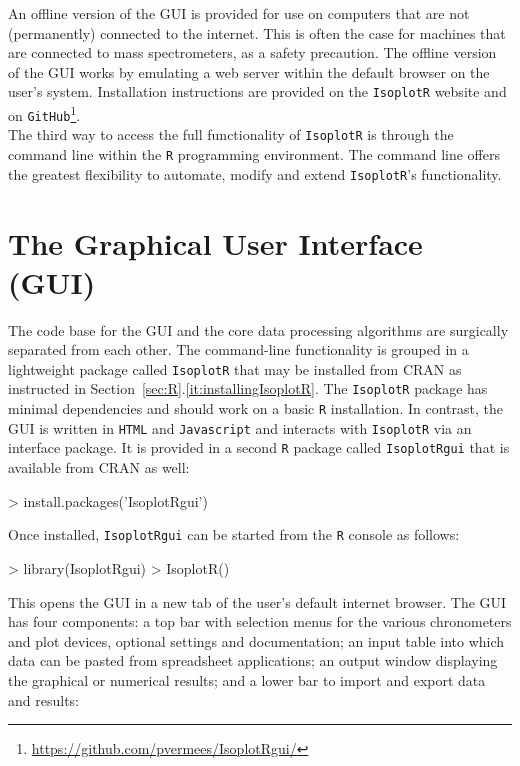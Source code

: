 \begin{refsection}
An offline version of the GUI is provided for use on computers that
are not (permanently) connected to the internet. This is often the
case for machines that are connected to mass spectrometers, as a
safety precaution. The offline version of the GUI works by emulating a
web server within the default browser on the user's
system. Installation instructions are provided on the
\texttt{IsoplotR} website and on
\texttt{GitHub}\footnote{\url{https://github.com/pvermees/IsoplotRgui/}}.\\

The third way to access the full functionality of \texttt{IsoplotR} is
through the command line within the \texttt{R} programming
environment. The command line offers the greatest flexibility to
automate, modify and extend \texttt{IsoplotR}'s functionality.

\section{The Graphical User Interface (GUI)}
\label{sec:GUI}

The code base for the GUI and the core data processing algorithms are
surgically separated from each other. The command-line functionality
is grouped in a lightweight package called \texttt{IsoplotR} that may
be installed from CRAN as instructed in
Section~\ref{sec:R}.\ref{it:installingIsoplotR}. The \texttt{IsoplotR}
package has minimal dependencies and should work on a basic \texttt{R}
installation. In contrast, the GUI is written in \texttt{HTML} and
\texttt{Javascript} and interacts with \texttt{IsoplotR} via an
interface package. It is provided in a second \texttt{R} package
called \texttt{IsoplotRgui} that is available from CRAN as well:

\begin{console}
> install.packages('IsoplotRgui')
\end{console}

Once installed, \texttt{IsoplotRgui} can be started from the
\texttt{R} console as follows:

\begin{console}
> library(IsoplotRgui)
> IsoplotR()
\end{console}

This opens the GUI in a new tab of the user's default internet
browser.  The GUI has four components: a top bar with selection menus
for the various chronometers and plot devices, optional settings and
documentation; an input table into which data can be pasted from
spreadsheet applications; an output window displaying the graphical or
numerical results; and a lower bar to import and export data and
results:\\


\end{refsection}
